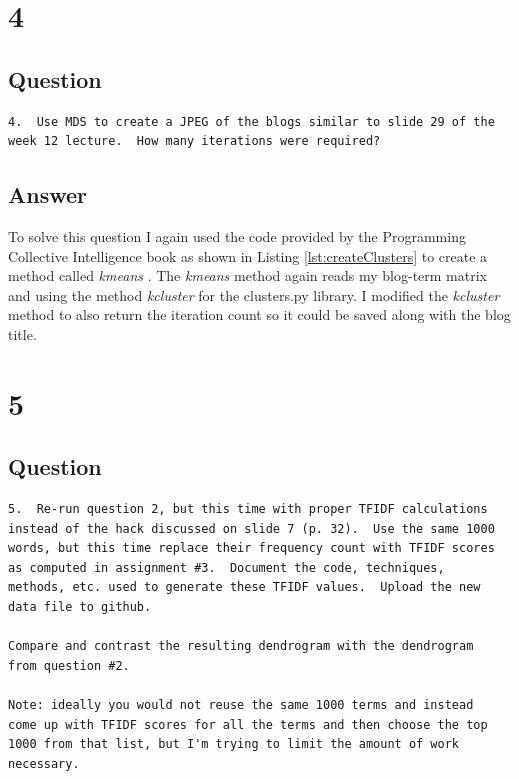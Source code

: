 \documentclass[letterpaper,11pt]{article}
\begin{document}
\clearpage


\section*{4}

\subsection*{Question}

\begin{verbatim}
4.  Use MDS to create a JPEG of the blogs similar to slide 29 of the 
week 12 lecture.  How many iterations were required?
\end{verbatim}

\subsection*{Answer}

To solve this question I again used the code provided by the Programming Collective Intelligence book as shown in Listing \ref{lst:createClusters} to create a method called \textit{kmeans} \cite{collectiveIntell}. The \textit{kmeans} method again reads my blog-term matrix and using the method \textit{kcluster} for the clusters.py library. I modified the \textit{kcluster} method to also return the iteration count so it could be saved along with the blog title. 


\clearpage


\section*{5}

\subsection*{Question}

\begin{verbatim}
5.  Re-run question 2, but this time with proper TFIDF calculations
instead of the hack discussed on slide 7 (p. 32).  Use the same 1000
words, but this time replace their frequency count with TFIDF scores
as computed in assignment #3.  Document the code, techniques,
methods, etc. used to generate these TFIDF values.  Upload the new
data file to github.

Compare and contrast the resulting dendrogram with the dendrogram
from question #2.

Note: ideally you would not reuse the same 1000 terms and instead
come up with TFIDF scores for all the terms and then choose the top
1000 from that list, but I'm trying to limit the amount of work
necessary.
\end{verbatim}
\end{document}
